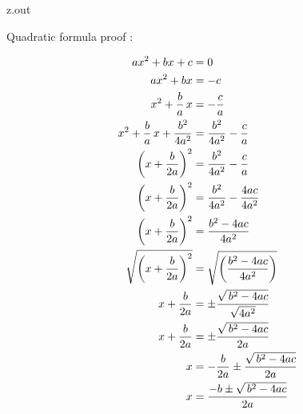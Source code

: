 \MyIO


\begin{VerbatimOut}{z.out}

Quadratic formula proof
\cite{khan2018}:

\begin{align}
  ax^2 + bx + c &= 0\\
  ax^2 + bx &= -c\notag\\
  x^2 + \frac ba\,x &= -\frac ca\notag\\
  x^2 + \frac ba\,x + \frac{b^2}{4a^2} &= \frac{b^2}{4a^2} - \frac ca\notag\\
  \left(x + \frac b{2a}\right)^2 &= \frac{b^2}{4a^2} - \frac ca\notag\\
  \left(x + \frac b{2a}\right)^2 &= \frac{b^2}{4a^2} - \frac{4ac}{4a^2}\notag\\
  \left(x + \frac b{2a}\right)^2 &= \frac{b^2-4ac}{4a^2}\notag\\
  \sqrt{\left(x + \frac b{2a}\right)^2}
    &= \sqrt{\left(\frac{b^2-4ac}{4a^2}\right)}\notag\\
  x + \frac b{2a} &= \pm \frac{\sqrt{\,b^2-4ac}}{\sqrt{4a^2}}\notag\\
  x + \frac b{2a} &= \pm \frac{\sqrt{\,b^2-4ac}}{2a}\notag\\
  x &= - \frac b{2a} \pm \frac{\sqrt{\,b^2-4ac}}{2a}\notag\\
  x &= \frac{-b \pm \sqrt{\,b^2-4ac}}{2a}
\end{align}
\end{VerbatimOut}

\MyIO


